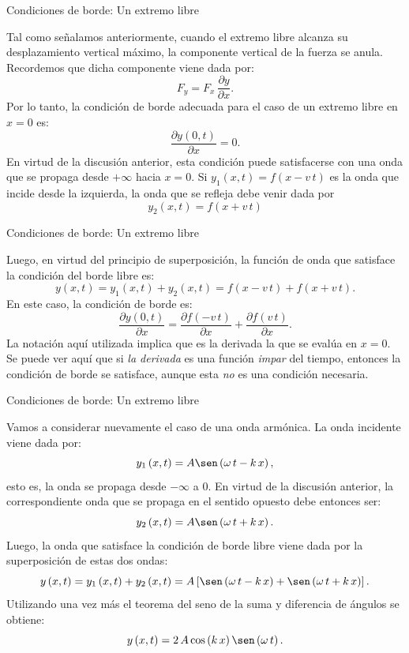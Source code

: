 \documentclass[11pt,handout,aspectratio=1610]{beamer}
\newcommand{\pdiff}[2]{\frac{\partial #1}{\partial #2}}
\begin{document}
\begin{frame}{Condiciones de borde: Un extremo libre}

    Tal como señalamos anteriormente, cuando el extremo libre alcanza su desplazamiento vertical máximo, la componente vertical de la fuerza se anula. Recordemos que dicha componente viene dada por: $$ F_y = F_x \, \pdiff{y}{x}. $$ Por lo tanto, la condición de borde adecuada para el caso de un extremo libre en $x= 0$ es: $$ \pdiff{y \left(0,t\right)}{x} = 0. $$ En virtud de la discusión anterior, esta condición puede satisfacerse con una onda que se propaga desde $+\infty$ hacia $x = 0$. Si $y_1 \left(x,t\right) = f \left(x - v \, t\right)$ es la onda que incide desde la izquierda, la onda que se refleja debe venir dada por $$ y_2 \left(x,t\right) = f \left(x + v \, t\right) $$
    
\end{frame}

\begin{frame}{Condiciones de borde: Un extremo libre}

    Luego, en virtud del principio de superposición, la función de onda que satisface la condición del borde libre es: $$ y \left(x,t\right) = y_1 \left(x,t\right) + y_2 \left(x,t \right)= f \left(x - v \, t\right) + f \left(x + v \, t\right). $$ En este caso, la condición de borde es: $$ \pdiff{y \left(0,t\right)}{x} = \pdiff{f \left(-v \, t\right)}{x} + \pdiff{f \left(v \, t\right)}{x}. $$ La notación aquí utilizada implica que es la derivada la que se evalúa en $x=0$. Se puede ver aquí que si \emph{la derivada} es una función \emph{impar} del tiempo, entonces la condición de borde se satisface, aunque esta \emph{no} es una condición necesaria.
    
\end{frame}

\begin{frame}{Condiciones de borde: Un extremo libre}

    Vamos a considerar nuevamente el caso de una onda armónica. La onda incidente viene dada por: $$ y_1 \left(x,t\right) = A \sen \left(\omega \, t - k \, x\right), $$ esto es, la onda se propaga desde $-\infty$ a $0$. En virtud de la discusión anterior, la correspondiente onda que se propaga en el sentido opuesto debe entonces ser: $$ y_2 \left(x,t\right) = A \sen \left(\omega \, t + k \, x\right). $$ Luego, la onda que satisface la condición de borde libre viene dada por la superposición de estas dos ondas: $$ y \left(x,t\right) = y_1 \left(x,t\right) + y_2 \left(x,t\right) = A \left[\sen \left(\omega \, t - k \, x\right) + \sen \left(\omega \, t + k \, x\right)\right]. $$ Utilizando una vez más el teorema del seno de la suma y diferencia de ángulos se obtiene: $$ y \left(x,t\right) = 2 \, A \cos \left(k \, x\right) \sen \left(\omega \, t\right). $$
    
\end{frame}
\end{document}
